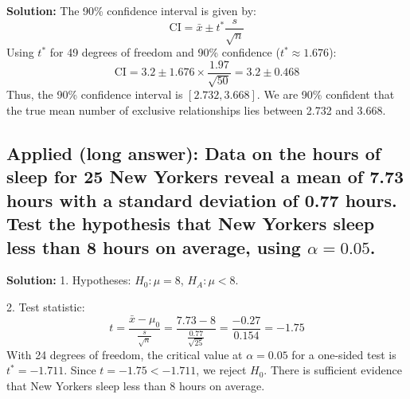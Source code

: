 \documentclass[12pt]{article}
\begin{document}
\textbf{Solution:}  
The 90\% confidence interval is given by:
\[
\text{CI} = \bar{x} \pm t^* \frac{s}{\sqrt{n}}
\]
Using \( t^* \) for 49 degrees of freedom and 90\% confidence (\( t^* \approx 1.676 \)):
\[
\text{CI} = 3.2 \pm 1.676 \times \frac{1.97}{\sqrt{50}} = 3.2 \pm 0.468
\]
Thus, the 90\% confidence interval is \( [2.732, 3.668] \). We are 90\% confident that the true mean number of exclusive relationships lies between 2.732 and 3.668.


\subsection{Applied (long answer): Data on the hours of sleep for 25 New Yorkers reveal a mean of 7.73 hours with a standard deviation of 0.77 hours. Test the hypothesis that New Yorkers sleep less than 8 hours on average, using \( \alpha = 0.05 \).}

\textbf{Solution:}  
1. Hypotheses:  
\( H_0: \mu = 8 \), \( H_A: \mu < 8 \).

2. Test statistic:
\[
t = \frac{\bar{x} - \mu_0}{\frac{s}{\sqrt{n}}} = \frac{7.73 - 8}{\frac{0.77}{\sqrt{25}}} = \frac{-0.27}{0.154} = -1.75
\]
With 24 degrees of freedom, the critical value at \( \alpha = 0.05 \) for a one-sided test is \( t^* = -1.711 \). Since \( t = -1.75 < -1.711 \), we reject \( H_0 \). There is sufficient evidence that New Yorkers sleep less than 8 hours on average.


 
\end{document}
